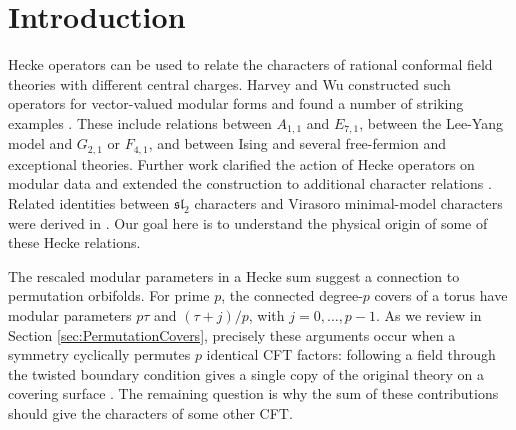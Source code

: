 \documentclass[12pt]{article}
\numberwithin{equation}{section}
\theoremstyle{remark}
\begin{document}
\setcounter{tocdepth}{2}

\tableofcontents

\section{Introduction}

Hecke operators can be used to relate the characters of rational conformal field theories with different central charges. Harvey and Wu constructed such operators for vector-valued modular forms and found a number of striking examples \cite{Harvey:2018rdc}. These include relations between $A_{1,1}$ and $E_{7,1}$, between the Lee-Yang model and $G_{2,1}$ or $F_{4,1}$, and between Ising and several free-fermion and exceptional theories. Further work clarified the action of Hecke operators on modular data and extended the construction to additional character relations \cite{Harvey:2019qzs,Duan:2022ltz}. Related identities between ${\mathfrak{sl}}_2$ characters and Virasoro minimal-model characters were derived in \cite{Adamovic:2025efe}. Our goal here is to understand the physical origin of some of these Hecke relations.

The rescaled modular parameters in a Hecke sum suggest a connection to permutation orbifolds. For prime $p$, the connected degree-$p$ covers of a torus have modular parameters $p\tau$ and $(\tau+j)/p$, with $j=0,\ldots,p-1$. As we review in Section \ref{sec:PermutationCovers}, precisely these arguments occur when a symmetry cyclically permutes $p$ identical CFT factors: following a field through the twisted boundary condition gives a single copy of the original theory on a covering surface \cite{Bantay:1997ek,Dijkgraaf:1996xw}. The remaining question is why the sum of these contributions should give the characters of some other CFT.
\end{document}

